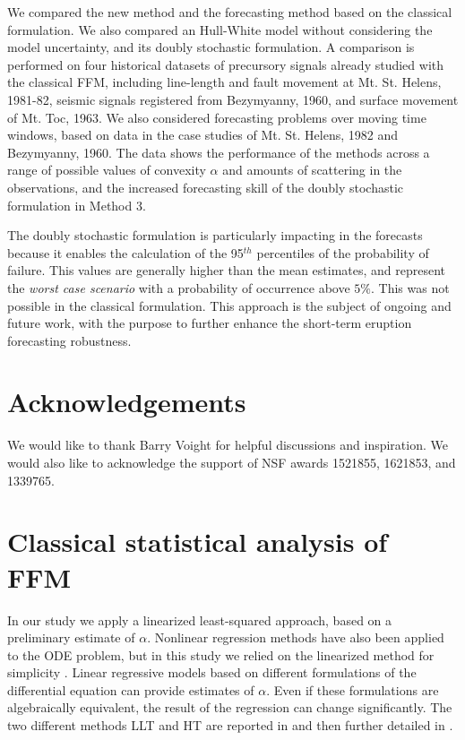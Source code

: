 \documentclass{article}
\begin{document}
We compared the new method and the forecasting method based on the classical formulation. We also compared an Hull-White model without considering the model uncertainty, and its doubly stochastic formulation. A comparison is performed on four historical datasets of precursory signals already studied with the classical FFM, including line-length and fault movement at Mt. St. Helens, 1981-82, seismic signals registered from Bezymyanny, 1960, and surface movement of Mt. Toc, 1963. We also considered forecasting problems over moving time windows, based on data in the case studies of Mt. St. Helens, 1982 and Bezymyanny, 1960. The data shows the performance of the methods across a range of possible values of convexity $\alpha$ and amounts of scattering in the observations, and the increased forecasting skill of the doubly stochastic formulation in Method 3.

The doubly stochastic formulation is particularly impacting in the forecasts because it enables the calculation of the 95$^{th}$ percentiles of the probability of failure. This values are generally higher than the mean estimates, and represent the \emph{worst case scenario} with a probability of occurrence above $5\%$. This was not possible in the classical formulation. This approach is the subject of ongoing and future work, with the purpose to further enhance the short-term eruption forecasting robustness.

\section*{Acknowledgements}

We would like to thank Barry Voight for helpful discussions and inspiration. We would also like to acknowledge the support of NSF awards 1521855, 1621853, and 1339765.


\appendix
\section{Classical statistical analysis of FFM}\label{A-1}
In our study we apply a linearized least-squared approach, based on a preliminary estimate of $\alpha$. Nonlinear regression methods have also been applied to the ODE problem, but in this study we relied on the linearized method for simplicity \citep{Bell2011}. Linear regressive models based on different formulations of the differential equation can provide estimates of $\alpha$. Even if these formulations are algebraically equivalent, the result of the regression can change significantly. The two different methods LLT and HT are reported in \cite{Voight1988} and then further detailed in \cite{Cornelius1995}.
\end{document}

